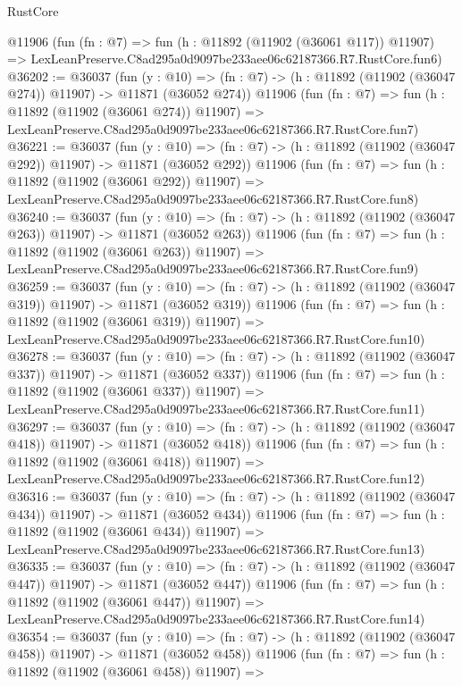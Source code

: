 \begin{lexlean}{RustCore}
\begin{coremodule}
    @11906
    (fun (fn : @7) =>
    fun (h : @11892 (@11902 (@36061 @117)) @11907) =>
    LexLeanPreserve.C8ad295a0d9097be233aee06c62187366.R7.RustCore.fun6)
@36202 := @36037
    (fun (y : @10) =>
    (fn : @7) -> (h : @11892 (@11902 (@36047 @274)) @11907) -> @11871 (@36052 @274))
    @11906
    (fun (fn : @7) =>
    fun (h : @11892 (@11902 (@36061 @274)) @11907) =>
    LexLeanPreserve.C8ad295a0d9097be233aee06c62187366.R7.RustCore.fun7)
@36221 := @36037
    (fun (y : @10) =>
    (fn : @7) -> (h : @11892 (@11902 (@36047 @292)) @11907) -> @11871 (@36052 @292))
    @11906
    (fun (fn : @7) =>
    fun (h : @11892 (@11902 (@36061 @292)) @11907) =>
    LexLeanPreserve.C8ad295a0d9097be233aee06c62187366.R7.RustCore.fun8)
@36240 := @36037
    (fun (y : @10) =>
    (fn : @7) -> (h : @11892 (@11902 (@36047 @263)) @11907) -> @11871 (@36052 @263))
    @11906
    (fun (fn : @7) =>
    fun (h : @11892 (@11902 (@36061 @263)) @11907) =>
    LexLeanPreserve.C8ad295a0d9097be233aee06c62187366.R7.RustCore.fun9)
@36259 := @36037
    (fun (y : @10) =>
    (fn : @7) -> (h : @11892 (@11902 (@36047 @319)) @11907) -> @11871 (@36052 @319))
    @11906
    (fun (fn : @7) =>
    fun (h : @11892 (@11902 (@36061 @319)) @11907) =>
    LexLeanPreserve.C8ad295a0d9097be233aee06c62187366.R7.RustCore.fun10)
@36278 := @36037
    (fun (y : @10) =>
    (fn : @7) -> (h : @11892 (@11902 (@36047 @337)) @11907) -> @11871 (@36052 @337))
    @11906
    (fun (fn : @7) =>
    fun (h : @11892 (@11902 (@36061 @337)) @11907) =>
    LexLeanPreserve.C8ad295a0d9097be233aee06c62187366.R7.RustCore.fun11)
@36297 := @36037
    (fun (y : @10) =>
    (fn : @7) -> (h : @11892 (@11902 (@36047 @418)) @11907) -> @11871 (@36052 @418))
    @11906
    (fun (fn : @7) =>
    fun (h : @11892 (@11902 (@36061 @418)) @11907) =>
    LexLeanPreserve.C8ad295a0d9097be233aee06c62187366.R7.RustCore.fun12)
@36316 := @36037
    (fun (y : @10) =>
    (fn : @7) -> (h : @11892 (@11902 (@36047 @434)) @11907) -> @11871 (@36052 @434))
    @11906
    (fun (fn : @7) =>
    fun (h : @11892 (@11902 (@36061 @434)) @11907) =>
    LexLeanPreserve.C8ad295a0d9097be233aee06c62187366.R7.RustCore.fun13)
@36335 := @36037
    (fun (y : @10) =>
    (fn : @7) -> (h : @11892 (@11902 (@36047 @447)) @11907) -> @11871 (@36052 @447))
    @11906
    (fun (fn : @7) =>
    fun (h : @11892 (@11902 (@36061 @447)) @11907) =>
    LexLeanPreserve.C8ad295a0d9097be233aee06c62187366.R7.RustCore.fun14)
@36354 := @36037
    (fun (y : @10) =>
    (fn : @7) -> (h : @11892 (@11902 (@36047 @458)) @11907) -> @11871 (@36052 @458))
    @11906
    (fun (fn : @7) =>
    fun (h : @11892 (@11902 (@36061 @458)) @11907) =>

\end{coremodule}
\end{lexlean}
